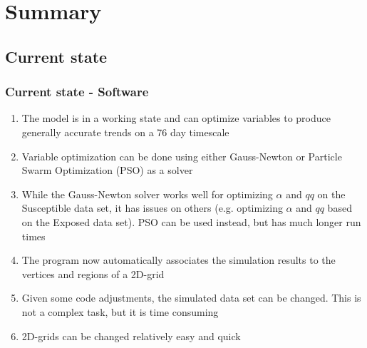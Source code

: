 \documentclass{beamer}
\begin{document}

\section{Summary}
\subsection{Current state}
\begin{frame}
	\frametitle{Current state - Software}
	\begin{enumerate}[$\bullet$]
		\item The model is in a working state and can optimize variables to produce generally accurate trends on a 76 day timescale
		\item Variable optimization can be done using either Gauss-Newton or Particle Swarm Optimization (PSO) as a solver
		\item While the Gauss-Newton solver works well for optimizing $\alpha$ and $qq$ on the Susceptible data set, it has issues on others
			(e.g. optimizing $\alpha$ and $qq$ based on the Exposed data set). PSO can be used instead, but has much longer run times
		\item The program now automatically associates the simulation results to the vertices and regions of a 2D-grid
		\item Given some code adjustments, the simulated data set can be changed. This is not a complex task, but it is time consuming
		\item 2D-grids can be changed relatively easy and quick
	\end{enumerate}
\end{frame}
\end{document}
